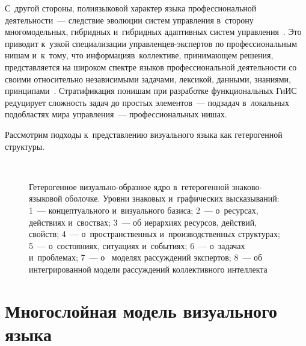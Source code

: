 \begin{multicols}{2}
  С~другой стороны, полиязыковой характер языка профессиональной 
деятельности~--- следствие эволюции систем управления в~сторону 
многомодельных, гибридных и~гибридных адаптивных сис\-тем 
управ\-ле\-ния~\cite{11-ls}. Это приводит к~узкой специ\-ализации  
управ\-лен\-цев-экс\-пер\-тов по профессиональным нишам и~к~тому, что 
информация\linebreak в~коллективе, принимающем решения, пред\-став\-ляется на широком 
спектре языков професси\-о\-нальной деятельности со своими относительно 
незави\-симыми задачами, лексикой, данными, знаниями,  
принципами~\cite{11-ls}. Стратификация по\linebreak нишам при разработке 
функциональных ГиИС редуцирует 
сложность задач до прос\-тых элементов~--- подзадач в~локальных подобластях 
мира управ\-ле\-ния~--- профессиональных нишах. 
  
  Рассмотрим подходы к~представлению визуального языка как гетерогенной 
структуры.

\begin{figure*} %
\vspace*{1pt}
\begin{center}
\mbox{%
\epsfxsize=138.171mm
}
\end{center}
\vspace*{6pt}

\noindent
{\small Гетерогенное визуально-образное ядро в~гетерогенной знаково-языковой оболочке. 
Уровни знаковых и~графических высказываний: {1}~--- концептуального и~визуального 
базиса; {2}~--- о~ресурсах, действиях и~своствах; 3~--- об иерархиях ресурсов, 
действий, свойств; {4}~--- о~пространственных и~производственных структурах; 
{5}~--- о~со\-сто\-яни\-ях, ситуациях и~событиях; {6}~--- о~задачах и~проблемах; 
{7}~--- о~ моделях рассуждений экспертов; {8}~--- об интегрированной модели 
рассуждений коллективного интеллекта}
\vspace*{6pt}
\end{figure*}

  
\section{Многослойная модель визуального языка}


\end{multicols}

